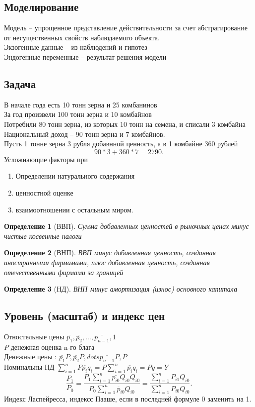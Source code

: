 \documentclass[14pt]{extarticle}
\newtheorem{definition}{Определение}
\begin{document}
\subsection{Моделирование}
Модель -- упрощенное представление действительности за счет абстрагирование от несущественных свойств наблюдаемого объекта.\\
Экзогенные данные -- из наблюдений и гипотез\\
Эндогенные переменные -- результат решения модели
\subsection{Задача}
В начале года есть 10 тонн зерна и 25 комбанинов\\
За год произвели 100 тонн зерна и 10 комбайнов\\
Потребили 80 тонн зерна, из которых 10 тонн на семена, и списали 3 комбайна\\
Национальный доход -- 90 тонн зерна и 7 комбайнов.\\
Пусть  1 тонне зерна 3 рубля добавнной ценность, а в 1 комбайне 360 рублей 
\[
90 * 3 + 360 * 7 = 2790
.\] 
Усложнающие факторы при
\begin{enumerate}
    \item Определении натурального содержания
    \item ценностной оценке
    \item взаимоотношении с остальным миром.
\end{enumerate}
\begin{definition}[ВВП]
    Сумма добавленных ценностей в рыночных ценах минус чистые косвенные налоги
\end{definition}
\begin{definition}[ВНП]
    ВВП минус добавленная ценность, созданная иностранными фирмамами, плюс добавленная ценность, созданная отечественными фирмами за границей
\end{definition}
\begin{definition}[НД]
    ВНП минус амортизация (износ) основного капитала
\end{definition}
\subsection{Уровень (масштаб) и индекс цен}
Отностельные цены $\overline{p_1},\overline{p_2},\dots,\overline{p_{n-1}},1$ \\
$P$ денежная оценка  n-го блага \\
Денежные цены : $\overline{p_1}P,\overline{p_2}P,dots \overline{p_{n-1}}P, P$\\
Номинальны НД $\sum_{i =  1}^{n} P \overline{p_{i}} q_{i} = P \sum_{i =1 }^{n} \overline{p_{i}}q_{i} = Py = Y$
\[
    \frac{P_1}{P_0} =  \frac{ P_1 \sum_{i = 1}^{n} \overline{p_{i0}}Q_{i0} Q_{i0}}{P_0 \sum_{i = 1}^{n} \overline{p}_{i0} Q_{i0}} = \frac{\sum_{i = 1}^{n} P_{i 1} Q_{i 0}}{\sum_{i = 1}^{n} P_{i 0} Q_{i 0 }}
.\] 
Индекс Ласпейресса, индексс Пааше, если в последней формуле 0 заменить на 1.
\end{document}
